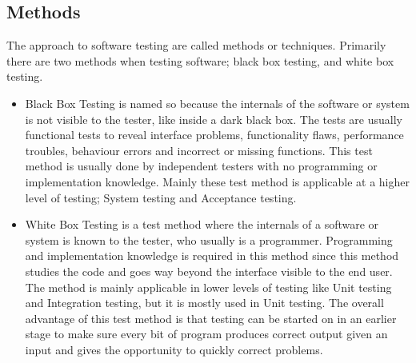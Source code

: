 \subsection{Methods}
The approach to software testing are called methods or techniques. Primarily there are two methods when testing software; black box testing, and white box testing.
\begin{itemize}
\item \label{def:blackboxtesting} Black Box Testing is named so because the internals of the software or system is not visible to the tester, like inside a dark black box. The tests are usually functional tests to reveal interface problems, functionality flaws, performance troubles, behaviour errors and incorrect or missing functions. This test method is usually done by independent testers with no programming or implementation knowledge. Mainly these test method is applicable at a higher level of testing; System testing and Acceptance testing.
\item White Box Testing is a test method where the internals of a software or system is known to the tester, who usually is a programmer. Programming and implementation knowledge is required in this method since this method studies the code and goes way beyond the interface visible to the end user. The method is mainly applicable in lower levels of testing like Unit testing and Integration testing, but it is mostly used in Unit testing. The overall advantage of this test method is that testing can be started on in an earlier stage to make sure every bit of program produces correct output given an input and gives the opportunity to quickly correct problems.
\end{itemize}
